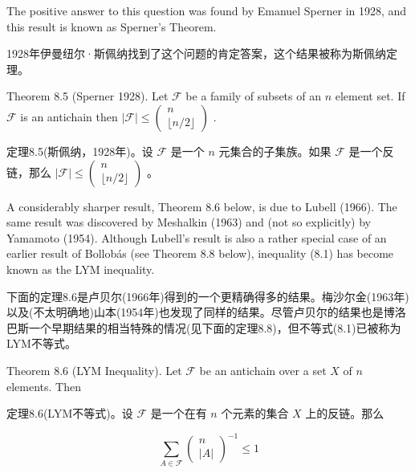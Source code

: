 \documentclass[10pt]{article}
\begin{document}
The positive answer to this question was found by Emanuel Sperner in 1928, and this result is known as Sperner's Theorem.

\begin{tcolorbox}\relax
1928年伊曼纽尔·斯佩纳找到了这个问题的肯定答案，这个结果被称为斯佩纳定理。
\end{tcolorbox}

Theorem 8.5 (Sperner 1928). Let \(\mathcal{F}\) be a family of subsets of an \(n\) element set. If \(\mathcal{F}\) is an antichain then \(\left| \mathcal{F}\right|  \leq  \left( \begin{matrix} n \\  \lfloor n/2\rfloor  \end{matrix}\right)\) .

\begin{tcolorbox}\relax
定理8.5(斯佩纳，1928年)。设 \(\mathcal{F}\) 是一个 \(n\) 元集合的子集族。如果 \(\mathcal{F}\) 是一个反链，那么 \(\left| \mathcal{F}\right|  \leq  \left( \begin{matrix} n \\  \lfloor n/2\rfloor  \end{matrix}\right)\) 。
\end{tcolorbox}

A considerably sharper result, Theorem 8.6 below, is due to Lubell (1966). The same result was discovered by Meshalkin (1963) and (not so explicitly) by Yamamoto (1954). Although Lubell's result is also a rather special case of an earlier result of Bollobás (see Theorem 8.8 below), inequality (8.1) has become known as the LYM inequality.

\begin{tcolorbox}\relax
下面的定理8.6是卢贝尔(1966年)得到的一个更精确得多的结果。梅沙尔金(1963年)以及(不太明确地)山本(1954年)也发现了同样的结果。尽管卢贝尔的结果也是博洛巴斯一个早期结果的相当特殊的情况(见下面的定理8.8)，但不等式(8.1)已被称为LYM不等式。
\end{tcolorbox}

Theorem 8.6 (LYM Inequality). Let \(\mathcal{F}\) be an antichain over a set \(X\) of \(n\) elements. Then

\begin{tcolorbox}\relax
定理8.6(LYM不等式)。设 \(\mathcal{F}\) 是一个在有 \(n\) 个元素的集合 \(X\) 上的反链。那么
\end{tcolorbox}

\[
\mathop{\sum }\limits_{{A \in  \mathcal{F}}}{\left( \begin{matrix} n \\  \left| A\right|  \end{matrix}\right) }^{-1} \leq  1 \tag{8.1}
\]
\end{document}
